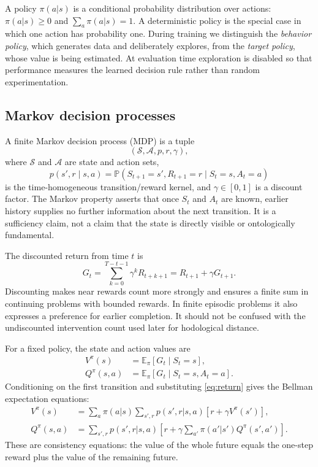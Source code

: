 \documentclass[11pt]{article}
\newcommand{\E}{\mathbb E}
\newcommand{\Prob}{\mathbb P}
\begin{document}
A policy $\pi(a|s)$ is a conditional probability distribution over actions:
$\pi(a|s)\geq0$ and $\sum_a\pi(a|s)=1$. A deterministic policy is the special
case in which one action has probability one. During training we distinguish
the \emph{behavior policy}, which generates data and deliberately explores,
from the \emph{target policy}, whose value is being estimated. At evaluation
time exploration is disabled so that performance measures the learned
decision rule rather than random experimentation.

\subsection{Markov decision processes}

A finite Markov decision process (MDP) is a tuple
\begin{equation}
 (\mathcal S,\mathcal A,p,r,\gamma),
\end{equation}
where $\mathcal S$ and $\mathcal A$ are state and action sets,
\begin{equation}
 p(s',r\mid s,a)
 =\Prob(S_{t+1}=s',R_{t+1}=r\mid S_t=s,A_t=a)
 \label{eq:mdp-kernel}
\end{equation}
is the time-homogeneous transition/reward kernel, and
$\gamma\in[0,1]$ is a discount factor. The Markov property asserts that once
$S_t$ and $A_t$ are known, earlier history supplies no further information
about the next transition. It is a sufficiency claim, not a claim that the
state is directly visible or ontologically fundamental.

The discounted return from time $t$ is
\begin{equation}
 G_t=\sum_{k=0}^{T-t-1}\gamma^kR_{t+k+1}
 =R_{t+1}+\gamma G_{t+1}.
 \label{eq:return}
\end{equation}
Discounting makes near rewards count more strongly and ensures a finite sum in
continuing problems with bounded rewards. In finite episodic problems it also
expresses a preference for earlier completion. It should not be confused with
the undiscounted intervention count used later for hodological distance.

For a fixed policy, the state and action values are
\begin{align}
 V^\pi(s)&=\E_\pi[G_t\mid S_t=s],\\
 Q^\pi(s,a)&=\E_\pi[G_t\mid S_t=s,A_t=a].
 \label{eq:value-defs}
\end{align}
Conditioning on the first transition and substituting
\cref{eq:return} gives the Bellman expectation equations:
\begin{align}
 V^\pi(s)
 &=\sum_a\pi(a|s)\sum_{s',r}p(s',r|s,a)
       [r+\gamma V^\pi(s')],\\
 Q^\pi(s,a)
 &=\sum_{s',r}p(s',r|s,a)
       \left[r+\gamma\sum_{a'}\pi(a'|s')Q^\pi(s',a')\right].
 \label{eq:bellman-expectation}
\end{align}
These are consistency equations: the value of the whole future equals the
one-step reward plus the value of the remaining future.
\end{document}
